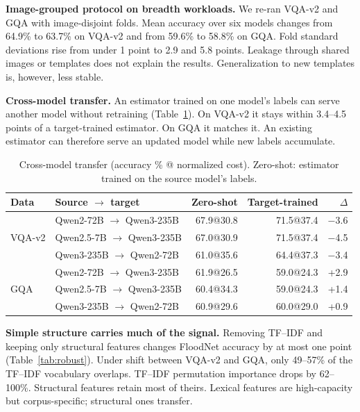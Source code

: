 \documentclass[10pt,conference]{IEEEtran}
\newcommand{\tableformat}{\footnotesize\setlength{\tabcolsep}{3pt}\renewcommand{\arraystretch}{0.95}}
\begin{document}
\textbf{Image-grouped protocol on breadth workloads.} We re-ran VQA-v2 and GQA
with image-disjoint folds. Mean accuracy over six models changes from 64.9\% to
63.7\% on VQA-v2 and from 59.6\% to 58.8\% on GQA. Fold standard deviations rise
from under 1 point to 2.9 and 5.8 points. Leakage through shared images or
templates does not explain the results. Generalization to new templates is,
however, less stable. %

\textbf{Cross-model transfer.} An estimator trained on one model's labels can
serve another model without retraining (Table~\ref{tab:xfer}). On VQA-v2 it
stays within 3.4--4.5 points of a target-trained estimator. On GQA it matches
it. An existing estimator can therefore serve an updated model while new
labels accumulate.

\begin{table}[t]
\centering
\tableformat
\caption{Cross-model transfer (accuracy \% @ normalized cost). Zero-shot:
estimator trained on the source model's labels.}
\label{tab:xfer}
\setlength{\tabcolsep}{2.5pt}
\begin{tabular}{llrrr}
\toprule
Data & Source $\rightarrow$ target & Zero-shot & Target-trained & $\Delta$ \\
\midrule
\multirow{3}{*}{VQA-v2} & Qwen2-72B $\rightarrow$ Qwen3-235B & 67.9@30.8 & 71.5@37.4 & $-$3.6 \\
 & Qwen2.5-7B $\rightarrow$ Qwen3-235B & 67.0@30.9 & 71.5@37.4 & $-$4.5 \\
 & Qwen3-235B $\rightarrow$ Qwen2-72B & 61.0@35.6 & 64.4@37.3 & $-$3.4 \\
\midrule
\multirow{3}{*}{GQA} & Qwen2-72B $\rightarrow$ Qwen3-235B & 61.9@26.5 & 59.0@24.3 & +2.9 \\
 & Qwen2.5-7B $\rightarrow$ Qwen3-235B & 60.4@34.3 & 59.0@24.3 & +1.4 \\
 & Qwen3-235B $\rightarrow$ Qwen2-72B & 60.9@29.6 & 60.0@29.0 & +0.9 \\
\bottomrule
\end{tabular}
\end{table}

\textbf{Simple structure carries much of the signal.} Removing TF--IDF and
keeping only structural features changes FloodNet accuracy by at most one
point (Table~\ref{tab:robust}). Under shift between VQA-v2 and GQA, only
49--57\% of the TF--IDF vocabulary overlaps. TF--IDF permutation importance
drops by 62--100\%. Structural features retain most of theirs. Lexical features
are high-capacity but corpus-specific; structural ones transfer.
\end{document}
